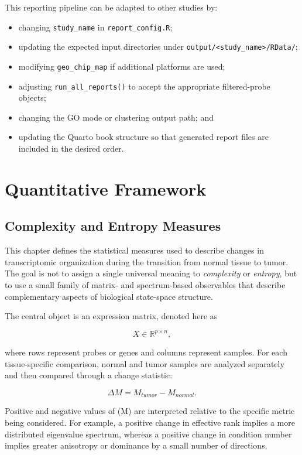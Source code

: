\documentclass[
  letterpaper,
  DIV=11,
  numbers=noendperiod,
  openany,
  oneside]{scrreprt}
\providecommand{\tightlist}{%
  \setlength{\itemsep}{0pt}\setlength{\parskip}{0pt}}
\begin{document}
This reporting pipeline can be adapted to other studies by:

\begin{itemize}
\tightlist
\item
  changing \texttt{study\_name} in \texttt{report\_config.R};
\item
  updating the expected input directories under
  \texttt{output/\textless{}study\_name\textgreater{}/RData/};
\item
  modifying \texttt{geo\_chip\_map} if additional platforms are used;
\item
  adjusting \texttt{run\_all\_reports()} to accept the appropriate
  filtered-probe objects;
\item
  changing the GO mode or clustering output path; and
\item
  updating the Quarto book structure so that generated report files are
  included in the desired order.
\end{itemize}

\part{Quantitative Framework}

\chapter{Complexity and Entropy
Measures}\label{complexity-and-entropy-measures}

This chapter defines the statistical measures used to describe changes
in transcriptomic organization during the transition from normal tissue
to tumor. The goal is not to assign a single universal meaning to
\emph{complexity} or \emph{entropy}, but to use a small family of
matrix- and spectrum-based observables that describe complementary
aspects of biological state-space structure.

The central object is an expression matrix, denoted here as

\[
X \in \mathbb{R}^{p \times n},
\]

where rows represent probes or genes and columns represent samples. For
each tissue-specific comparison, normal and tumor samples are analyzed
separately and then compared through a change statistic:

\[
\Delta M = M_{tumor} - M_{normal}.
\]

Positive and negative values of (\Delta M) are interpreted relative to
the specific metric being considered. For example, a positive change in
effective rank implies a more distributed eigenvalue spectrum, whereas a
positive change in condition number implies greater anisotropy or
dominance by a small number of directions.
\end{document}
